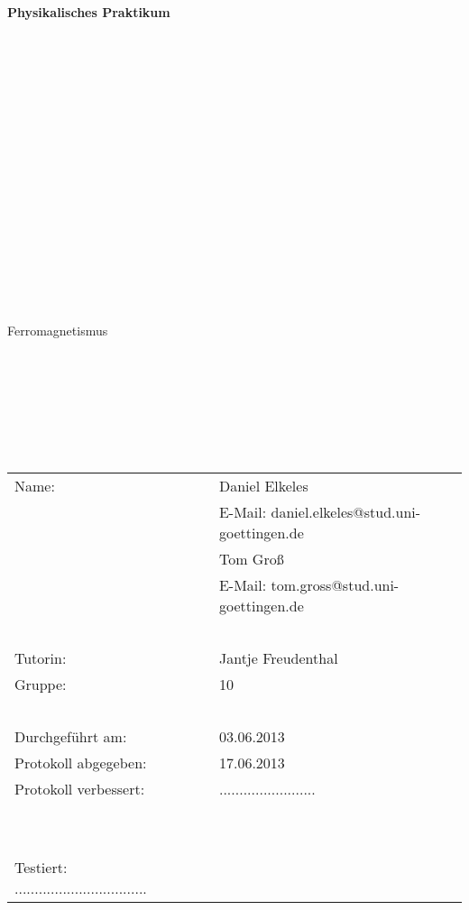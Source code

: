 \thispagestyle{empty}
\begin{center}
    {\Huge{\textbf{Physikalisches Praktikum}}}\\[16pt]
\ \\
\ \\
\ \\
\ \\
\ \\
\ \\
\ \\
\ \\
\ \\
\ \\
\ \\
\ \\
\ \\
\ \\
\ \\
\ \\
\ \\
\huge{Ferromagnetismus}
\ \\
\ \\
\large{}
\end{center}

\normalsize
\ \\
\ \\
\ \\
\ \\
\ \\

\begin{center}
\begin{tabular}{lcl}
      Name: & ~ & Daniel Elkeles \\
                    & ~ & E-Mail: daniel.elkeles@stud.uni-goettingen.de \\
	  		& ~ & Tom Groß \\
		    		& ~ & E-Mail: tom.gross@stud.uni-goettingen.de \\
\ \\		    
      Tutorin: & ~ & Jantje Freudenthal \\
      Gruppe: & ~ & 10 \\
\ \\      
      Durchgeführt am: & ~ & 03.06.2013 \\
      Protokoll abgegeben: & ~ & 17.06.2013 \\
      Protokoll verbessert: & ~ & ........................\\
\ \\
\ \\
      Testiert: .................................    
\end{tabular}\\
\end{center}
